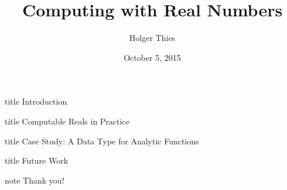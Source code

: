 \documentclass[xcolor=pdftex,dvipsnames,table]{beamer}
\title[Computing with Reals]{Computing with Real Numbers}
\author[ H. Thies]{
		Holger Thies 
}
\institute[The University of Tokyo]{
The University of Tokyo
}
\begin{document}
\date{October 5, 2015}
\frame{
\titlepage
}
\begin{frame}
	\begin{beamercolorbox}[sep=8pt,center,shadow=true,rounded=true]{title}
	Introduction\par%
    \end{beamercolorbox}
\vfill
\end{frame}


\begin{frame}
	\begin{beamercolorbox}[sep=8pt,center,shadow=true,rounded=true]{title}
	Computable Reals in Practice\par%
    \end{beamercolorbox}
\vfill
\end{frame}

\begin{frame}
	\begin{beamercolorbox}[sep=8pt,center,shadow=true,rounded=true]{title}
	Case Study: A Data Type for Analytic Functions\par%
    \end{beamercolorbox}
\vfill
\end{frame}



\begin{frame}
	\begin{beamercolorbox}[sep=8pt,center,shadow=true,rounded=true]{title}
	Future Work\par%
    \end{beamercolorbox}
\vfill
\end{frame}

\begin{frame}

    \vspace{\fill}
\begin{beamercolorbox}[center,shadow=true,rounded=true]{note} 
        \huge Thank you!
\end{beamercolorbox}

    \vspace{\fill}
\end{frame} 
\end{document}
